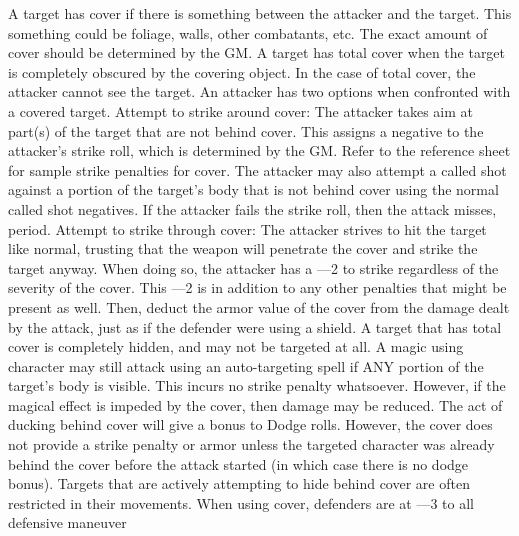 \documentclass[twoside]{book}
\begin{document}
                
              A target has cover if there is something between
               the attacker and the target. This something could be
               foliage, walls, other combatants, etc. The exact amount of
               cover should be determined by the GM. A target has total
               cover when the target is completely obscured by the
               covering object. In the case of total cover, the attacker
               cannot see the target.   An attacker has two options when confronted with a
               covered target.   Attempt to strike around cover: The attacker takes
               aim at part(s) of the target that are not behind cover.
               This assigns a negative to the attacker’s strike
               roll, which is determined by the GM. Refer to the
               reference sheet for sample strike penalties for cover. The
               attacker may also attempt a called shot against a portion
               of the target’s body that is not behind cover using
               the normal called shot negatives. If the attacker fails
               the strike roll, then the attack misses, period.   Attempt to strike through cover: The attacker
               strives to hit the target like normal, trusting that the
               weapon will penetrate the cover and strike the target
               anyway. When doing so, the attacker has a —2 to
               strike regardless of the severity of the cover. This
               —2 is in addition to any other penalties that might
               be present as well. Then, deduct the armor value of the
               cover from the damage dealt by the attack, just as if the
               defender were using a shield.   A target that has total cover is completely hidden,
               and may not be targeted at all.   A magic using character may still attack using an
               auto-targeting spell if ANY portion of the target’s
               body is visible. This incurs no strike penalty whatsoever.
               However, if the magical effect is impeded by the cover,
               then damage may be reduced.   The act of ducking behind cover will give a bonus
               to Dodge rolls. However, the cover does not provide a
               strike penalty or armor unless the targeted character was
               already behind the cover before the attack started (in
               which case there is no dodge bonus).   Targets that are actively attempting to hide behind
               cover are often restricted in their movements. When using
               cover, defenders are at —3 to all defensive maneuver
\end{document}
